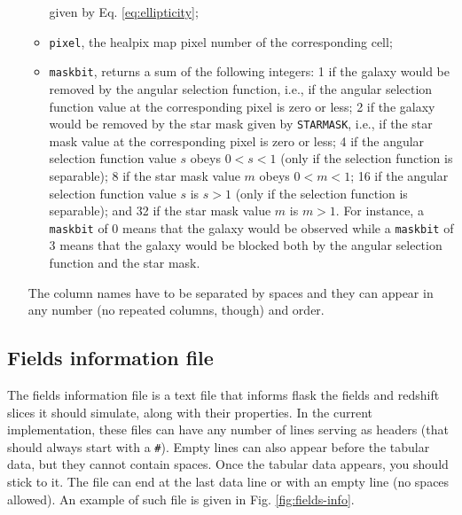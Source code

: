 \documentclass[12pt]{book} %
\begin{document}
\begin{itemize}
\begin{itemize}
    given by Eq. \ref{eq:ellipticity};
  \item {\tt pixel}, the {\sc healpix} map pixel number of the corresponding cell; 
  \item {\tt maskbit}, returns a sum of the following integers: 1 if the galaxy would 
    be removed by the angular selection function, i.e., if the angular selection function value 
    at the corresponding pixel is zero or less; 2 if the galaxy would be removed by the star mask 
    given by {\tt STARMASK}, i.e., if the star mask value at the corresponding pixel is zero or less; 
    4 if the angular selection function value $s$ obeys $0<s<1$ (only if the selection function is 
    separable); 8 if the star mask value $m$ obeys $0<m<1$; 16 if the angular selection 
    function value $s$ is $s>1$ (only if the selection function is separable); and 32 
    if the star mask value $m$ is $m>1$. For instance, a {\tt maskbit} of 0 means that the galaxy would be observed 
    while a {\tt maskbit} of 3 means that the galaxy would be blocked both by the angular selection
    function and the star mask.
  \end{itemize}
  The column names have to be separated by spaces and they can appear in any number (no repeated 
  columns, though) and order.
\end{itemize}


\subsection{Fields information file}
\label{sec:fields-info}

The fields information file is a text file that informs {\sc flask} the fields and redshift 
slices it should simulate, along with their properties. In the current implementation, these 
files can have any number of lines serving as headers (that should always start with a {\tt \#}). 
Empty lines can also appear before the tabular data, but they cannot contain spaces. Once 
the tabular data appears, you should stick to it. The file can end at the last data line or 
with an empty line (no spaces allowed). An example of such file is given in Fig. \ref{fig:fields-info}.
\end{document}
